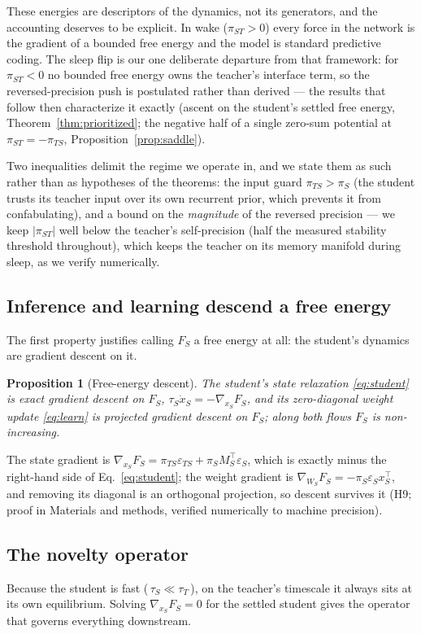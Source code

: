\documentclass[10pt,letterpaper]{article}
\theoremstyle{plain}
\newtheorem{proposition}{Proposition}
\theoremstyle{remark}
\newcommand{\eps}{\varepsilon}
\newcommand{\xS}{x_S}
\newcommand{\WS}{W_S}
\newcommand{\MS}{M_S}
\newcommand{\FS}{F_S}
\newcommand{\epsS}{\eps_S}
\newcommand{\epsTS}{\eps_{TS}}
\newcommand{\piS}{\pi_S}
\newcommand{\piTS}{\pi_{TS}}
\newcommand{\piST}{\pi_{ST}}
\newcommand{\tauT}{\tau_T}
\newcommand{\tauS}{\tau_S}
\newcommand{\tr}{^{\!\top}}
\begin{document}
These energies are descriptors of the dynamics, not its generators, and the accounting deserves to be
explicit. In wake ($\piST>0$) every force in the network is the gradient of a bounded free energy and
the model is standard predictive coding. The sleep flip is our one deliberate departure from that
framework: for $\piST<0$ no bounded free energy owns the teacher's interface term, so the
reversed-precision push is postulated rather than derived --- the results that follow then characterize
it exactly (ascent on the student's settled free energy, Theorem~\ref{thm:prioritized}; the negative
half of a single zero-sum potential at $\piST=-\piTS$, Proposition~\ref{prop:saddle}).

Two inequalities delimit the regime we operate in, and we state them as such rather than as hypotheses
of the theorems: the input guard $\piTS>\piS$ (the student trusts its teacher input over its own
recurrent prior, which prevents it from confabulating), and a bound on the \emph{magnitude} of the
reversed precision --- we keep $|\piST|$ well below the teacher's self-precision (half the measured
stability threshold throughout), which keeps the teacher on its memory manifold during sleep, as we
verify numerically.

\subsection{Inference and learning descend a free energy}
The first property justifies calling $\FS$ a free energy at all: the student's dynamics are gradient
descent on it.

\begin{proposition}[Free-energy descent]
\label{prop:descent}
The student's state relaxation \eqref{eq:student} is exact gradient descent on $\FS$,
$\tauS\dot\xS=-\nabla_{\xS}\FS$, and its zero-diagonal weight update \eqref{eq:learn} is projected
gradient descent on $\FS$; along both flows $\FS$ is non-increasing.
\end{proposition}

The state gradient is $\nabla_{\xS}\FS=\piTS\epsTS+\piS\MS\tr\epsS$, which is exactly minus the
right-hand side of Eq.~\eqref{eq:student}; the weight gradient is
$\nabla_{\WS}\FS=-\piS\epsS\xS\tr$, and removing its diagonal is an orthogonal projection, so descent
survives it (H9; proof in Materials and methods, verified numerically to machine precision).

\subsection{The novelty operator}
Because the student is fast (\,$\tauS\ll\tauT$\,), on the teacher's timescale it always sits at its own
equilibrium. Solving $\nabla_{\xS}\FS=0$ for the settled student gives the operator that governs
everything downstream.
\end{document}
